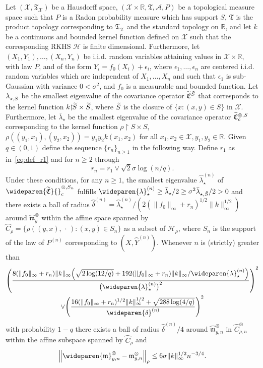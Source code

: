 \documentclass[10pt]{amsart}
\theoremstyle{definition}\newtheorem{defi}[theo]{Definition}\newtheorem{rema}[theo]{Remark}\newtheorem{exam}[theo]{Example}\newtheorem{exem}[theo]{Example}\newtheorem{nota}[theo]{Notation}
\theoremstyle{remark}
\newcommand{\restrr}
{\!\!\upharpoonright\!\!}
\newcommand{\R}{\mathbb{R}}
\newcommand{\X}{\mathcal{X}}
\newcommand{\clA}{\mathcal{A}}
\newcommand{\cH}{\mathcal{H}}
\newcommand{\fkC}{\mathfrak{C}}
\newcommand{\fkT}{\mathfrak{T}}
\newcommand{\Cov}{\tilde{\fkC}}
\newcommand{\mean}{\mathfrak{m}}
\newcommand{\CovCapn}{\wideparen{\widetilde{\fkC}}{\vphantom{\fkC}}^{\otimes,S_n}_c}
\let\oldtilde\tilde
\renewcommand*{\tilde}[1]{\mathchoice{\widetilde{#1}}{\widetilde{#1}}{\oldtilde{#1}}{\oldtilde{#1}}}
\let\originalleft\left
\let\originalright\right
\renewcommand{\left}{\mathopen{}\mathclose\bgroup\originalleft}
\renewcommand{\right}{\aftergroup\egroup\originalright}
\begin{document}
\begin{prop}\label{prop:unbounded}
Let $(\X, \fkT_\X)$ be a Hausdorff space, $(\X \times \R,\fkT, \clA,P)$ be a topological measure space such that $P$ is a Radon probability measure which has support $S$, $\fkT$ is the product topology corresponding to $\fkT_\X$ and the standard topology on $\R$, and let $k$ be a continuous and bounded kernel function defined on $\X$ such that the corresponding RKHS $\cH$ is finite dimensional. Furthermore, let $(X_1,Y_1),\dots, (X_n,Y_n)$ be i.i.d. random variables attaining values in $\X \times \R$, with law $P$, and of the form $Y_i = f_0(X_i) + \epsilon_i$, where $\epsilon_1,\dots, \epsilon_n$ are centered i.i.d. random variables which are independent of $X_1,\dots, X_n$ and such that $\epsilon_1$ is sub-Gaussian with variance $0 < \sigma^2$, and $f_0$ is a measurable and bounded function. Let $\bar \lambda_{\star,\tilde S}$ be the smallest eigenvalue of the covariance operator $\Cov^{\tilde S}$ that corresponds to the kernel function $k\restrr \tilde S \times \tilde S$, where $\tilde S$ is the closure of $\{x : (x,y) \in S\}$ in $\X$. Furthermore, let $\bar \lambda_\star$ be the smallest eigenvalue of the covariance operator $\Cov^{\otimes,S}_c$ corresponding to the kernel function $\rho \restrr S \times S$, $\rho((y_1,x_1),(y_2,x_2)) = y_1 y_2 k(x_1,x_2)$ for all $x_1,x_2 \in \X, y_1,y_2 \in \R$.\pagebreak{} Given $q \in (0,1)$ define the sequence $\{r_n\}_{n\geq 1}$ in the following way. Define $r_1$ as in~\eqref{eq:def_r1} and for $n \geq 2$ through
\[
r_n = r_1 \vee \sqrt{2} \sigma \log(n/q).
\]
Under these conditions, for any $n\geq 1$, the smallest eigenvalue $\wideparen{\lambda}_\star^{(n)}$ of $\CovCapn$ fulfills $\wideparen{\lambda}_\star^{(n)} \geq \bar \lambda_\star/2 \geq \sigma^2 \bar \lambda_{\star,\tilde S}/2 > 0$ and there exists a ball of radius $\wideparen{\delta}^{(n)} = \wideparen{\lambda}_\star^{(n)} / (2 (\|f_0\|_\infty + r_n)^{1/2} \|k\|^{1/2}_\infty)$ around $\wideparen{\mean}^\otimes_{y}$ within the affine space spanned by $\wideparen{C}_\rho = \{ \rho((y,x),\,\cdot\,) : (x,y) \in S_n\}$ as a subset of $\cH_\rho$, where $S_n$ is the support of the law of $P^{(n)}$ corresponding to $(X,\wideparen{Y}^{(n)})$. Whenever $n$ is (strictly) greater than
\begin{multline*}
\left(\frac{8 (\|f_0\|_\infty + r_n) \|k\|_\infty \left(\sqrt{2\log(12/q)} + 192 (\|f_0\|_\infty + r_n) \|k\|_\infty /\wideparen{\lambda}^{(n)}_\star\right)}{\bigl(\wideparen{\lambda}^{(n)}_\star\bigr)^2} \right)^{2} \\
\vee \left(\frac{16 (\|f_0\|_\infty + r_n)^{1/2} \|k\|_\infty^{1/2} + \sqrt{288\log(4/q)}}{\wideparen{\delta}^{(n)}}\right)^{2}
\end{multline*}
with probability $1-q$ there exists a ball of radius $\wideparen{\delta}^{(n)}/4$ around $\wideparen{\mean}^\otimes_{y,n}$ in $\wideparen{C}^{\otimes}_{\rho,n}$ within the affine subspace spanned by $\wideparen{C}_\rho$ and
\[
\left\|\wideparen{\mean}^\otimes_{y,n} - \mean_{y,n}^\otimes \right\|_\rho \leq 6 \sigma \|k\|_\infty^{1/2} n^{-3/4}.
\]
\end{prop}
\end{document}
